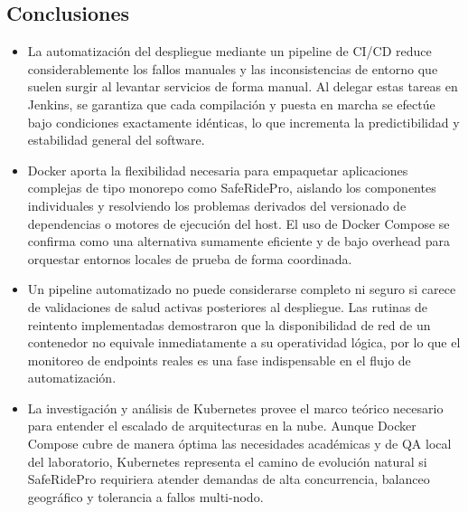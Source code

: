 \documentclass{article}
\begin{document}
\subsection{Conclusiones}
\begin{itemize}
    \item La automatización del despliegue mediante un pipeline de CI/CD reduce considerablemente los fallos manuales y las inconsistencias de entorno que suelen surgir al levantar servicios de forma manual. Al delegar estas tareas en Jenkins, se garantiza que cada compilación y puesta en marcha se efectúe bajo condiciones exactamente idénticas, lo que incrementa la predictibilidad y estabilidad general del software.
    \item Docker aporta la flexibilidad necesaria para empaquetar aplicaciones complejas de tipo monorepo como SafeRidePro, aislando los componentes individuales y resolviendo los problemas derivados del versionado de dependencias o motores de ejecución del host. El uso de Docker Compose se confirma como una alternativa sumamente eficiente y de bajo overhead para orquestar entornos locales de prueba de forma coordinada.
    \item Un pipeline automatizado no puede considerarse completo ni seguro si carece de validaciones de salud activas posteriores al despliegue. Las rutinas de reintento implementadas demostraron que la disponibilidad de red de un contenedor no equivale inmediatamente a su operatividad lógica, por lo que el monitoreo de endpoints reales es una fase indispensable en el flujo de automatización.
    \item La investigación y análisis de Kubernetes provee el marco teórico necesario para entender el escalado de arquitecturas en la nube. Aunque Docker Compose cubre de manera óptima las necesidades académicas y de QA local del laboratorio, Kubernetes representa el camino de evolución natural si SafeRidePro requiriera atender demandas de alta concurrencia, balanceo geográfico y tolerancia a fallos multi-nodo.
\end{itemize}
\end{document}
